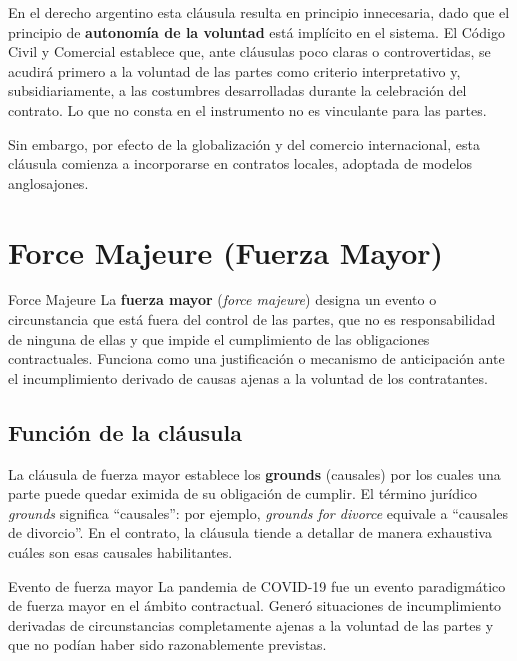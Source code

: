 \documentclass[12pt,oneside]{book}
\begin{document}
En el derecho argentino esta cláusula resulta en principio innecesaria,
dado que el principio de \textbf{autonomía de la voluntad} está implícito
en el sistema. El Código Civil y Comercial establece que, ante cláusulas
poco claras o controvertidas, se acudirá primero a la voluntad de las
partes como criterio interpretativo y, subsidiariamente, a las costumbres
desarrolladas durante la celebración del contrato. Lo que no consta en el
instrumento no es vinculante para las partes.

Sin embargo, por efecto de la globalización y del comercio internacional,
esta cláusula comienza a incorporarse en contratos locales, adoptada de
modelos anglosajones.

\section{Force Majeure (Fuerza Mayor)}

\begin{definition}{Force Majeure}
La \textbf{fuerza mayor} (\textit{force majeure}) designa un evento o
circunstancia que está fuera del control de las partes, que no es
responsabilidad de ninguna de ellas y que impide el cumplimiento de las
obligaciones contractuales. Funciona como una justificación o mecanismo
de anticipación ante el incumplimiento derivado de causas ajenas a la
voluntad de los contratantes.
\end{definition}

\subsection{Función de la cláusula}

La cláusula de fuerza mayor establece los \textbf{grounds} (causales)
por los cuales una parte puede quedar eximida de su obligación de cumplir.
El término jurídico \textit{grounds} significa ``causales'': por ejemplo,
\textit{grounds for divorce} equivale a ``causales de divorcio''. En el
contrato, la cláusula tiende a detallar de manera exhaustiva cuáles son
esas causales habilitantes.

\begin{example}{Evento de fuerza mayor}
La pandemia de COVID-19 fue un evento paradigmático de fuerza mayor en el
ámbito contractual. Generó situaciones de incumplimiento derivadas de
circunstancias completamente ajenas a la voluntad de las partes y que no
podían haber sido razonablemente previstas.
\end{example}
\end{document}
